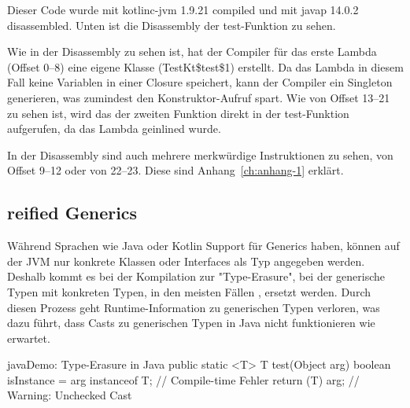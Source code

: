 Dieser Code wurde mit kotlinc-jvm 1.9.21 compiled und mit javap 14.0.2 disassembled.
Unten ist die Disassembly der test-Funktion zu sehen.


Wie in der Disassembly zu sehen ist, hat der Compiler für das erste Lambda (Offset 0--8) eine eigene Klasse
(TestKt\$test\$1) erstellt.
Da das Lambda in diesem Fall keine Variablen in einer Closure speichert, kann der Compiler ein Singleton generieren,
was zumindest den Konstruktor-Aufruf spart.
Wie von Offset 13--21 zu sehen ist, wird das  der zweiten Funktion direkt in der test-Funktion
aufgerufen, da das Lambda geinlined wurde.

\begin{infoBox}
In der Disassembly sind auch mehrere merkwürdige Instruktionen zu sehen, \zB von Offset 9--12 oder von 22--23.
Diese sind Anhang~\ref{ch:anhang-1} erklärt.
\end{infoBox}

\subsection{reified Generics}

Während Sprachen wie Java oder Kotlin Support für Generics haben, können auf der JVM nur konkrete Klassen oder
Interfaces als Typ angegeben werden.
Deshalb kommt es bei der Kompilation zur "Type-Erasure", bei der generische Typen mit konkreten Typen, in den meisten
Fällen , ersetzt werden.
Durch diesen Prozess geht Runtime-Information zu generischen Typen verloren, was \zB dazu führt, dass Casts zu
generischen Typen in Java nicht funktionieren wie erwartet.

\begin{codeBlock}{java}{Demo: Type-Erasure in Java}
public static <T> T test(Object arg) {
    boolean isInstance = arg instanceof T; // Compile-time Fehler
    return (T) arg; // Warning: Unchecked Cast
}
\end{codeBlock}

